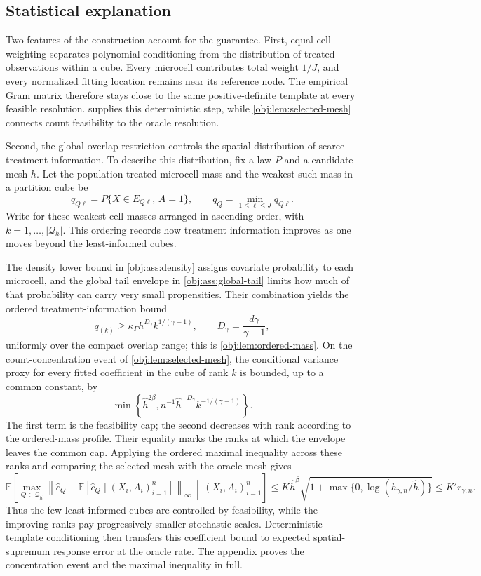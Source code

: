 \documentclass[11pt]{article}
\begin{document}
\subsection{Statistical explanation}

Two features of the construction account for the guarantee. First, equal-cell weighting separates polynomial conditioning from the distribution of treated observations within a cube. Every microcell contributes total weight \(1/J\), and every normalized fitting location remains near its reference node. The empirical Gram matrix therefore stays close to the same positive-definite template at every feasible resolution.  supplies this deterministic step, while \cref{obj:lem:selected-mesh} connects count feasibility to the oracle resolution.

Second, the global overlap restriction controls the spatial distribution of scarce treatment information. To describe this distribution, fix a law \(P\) and a candidate mesh \(h\). Let the population treated microcell mass  and the weakest such mass in a partition cube  be
\[
q_{Q\ell}
=
P\{X\in E_{Q\ell},\,A=1\},
\qquad
q_Q=\min_{1\le\ell\le J}q_{Q\ell}.
\]
Write  for these weakest-cell masses arranged in ascending order, with \(k=1,\ldots,|\mathcal Q_h|\). This ordering records how treatment information improves as one moves beyond the least-informed cubes.

The density lower bound in \cref{obj:ass:density} assigns covariate probability to each microcell, and the global tail envelope in \cref{obj:ass:global-tail} limits how much of that probability can carry very small propensities. Their combination yields the ordered treatment-information bound
\[
q_{(k)}\ge \kappa_\Gamma h^{D_\gamma}k^{1/(\gamma-1)},
\qquad
D_\gamma=\frac{d\gamma}{\gamma-1},
\]
uniformly over the compact overlap range; this is \cref{obj:lem:ordered-mass}. On the count-concentration event of \cref{obj:lem:selected-mesh}, the conditional variance proxy for every fitted coefficient in the cube of rank \(k\) is bounded, up to a common constant, by
\[
\min\!\left\{
\widehat h^{2\beta},
n^{-1}\widehat h^{-D_\gamma}k^{-1/(\gamma-1)}
\right\}.
\]
The first term is the feasibility cap; the second decreases with rank according to the ordered-mass profile. Their equality marks the ranks at which the envelope leaves the common cap. Applying the ordered maximal inequality across these ranks and comparing the selected mesh with the oracle mesh gives
\[
\mathbb E\!\left[
\max_{Q\in\mathcal Q_{\widehat h}}
\left\|\widehat c_Q-
\mathbb E[\widehat c_Q\mid(X_i,A_i)_{i=1}^n]\right\|_\infty
\,\middle|\,(X_i,A_i)_{i=1}^n
\right]
\le K\widehat h^\beta
\sqrt{1+\max\{0,\log(h_{\gamma,n}/\widehat h)\}}
\le K'r_{\gamma,n}.
\]
Thus the few least-informed cubes are controlled by feasibility, while the improving ranks pay progressively smaller stochastic scales. Deterministic template conditioning then transfers this coefficient bound to expected spatial-supremum response error at the oracle rate. The appendix proves the concentration event and the maximal inequality in full.
\end{document}
